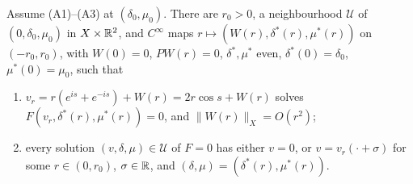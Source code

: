 \documentclass[11pt,a4paper]{report}
\begin{document}
\begin{proposition}\label{prop:LS}
Assume (A1)--(A3) at $(\delta_0,\mu_0)$. There are $r_0>0$, a neighbourhood $\mathcal U$ of $(0,\delta_0,\mu_0)$ in $X\times\mathbb{R}^2$, and $C^\infty$ maps $r\mapsto(W(r),\delta^*(r),\mu^*(r))$ on $(-r_0,r_0)$, with $W(0)=0$, $PW(r)=0$, $\delta^*,\mu^*$ even, $\delta^*(0)=\delta_0$, $\mu^*(0)=\mu_0$, such that
\begin{enumerate}
\item $v_r=r(e^{is}+e^{-is})+W(r)=2r\cos s+W(r)$ solves $F(v_r,\delta^*(r),\mu^*(r))=0$, and $\|W(r)\|_X=O(r^2)$;
\item every solution $(v,\delta,\mu)\in\mathcal U$ of $F=0$ has either $v=0$, or $v=v_r(\cdot+\sigma)$ for some $r\in(0,r_0)$, $\sigma\in\mathbb{R}$, and $(\delta,\mu)=(\delta^*(r),\mu^*(r))$.
\end{enumerate}
\end{proposition}
\end{document}
